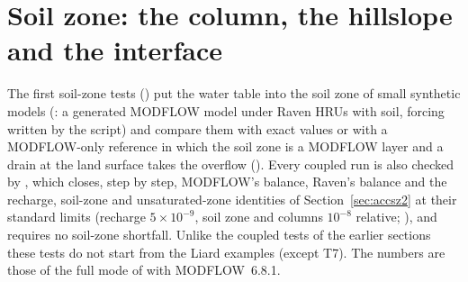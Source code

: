 \section{Soil zone: the column, the hillslope and the interface}\label{sec:vsoilzone1}
The first soil-zone tests () put the water table into the soil zone of small synthetic models
(: a generated MODFLOW model under Raven HRUs with soil, forcing written by the script) and compare
them with exact values or with a MODFLOW-only reference in which the soil zone is a MODFLOW layer and a drain at the land
surface takes the overflow (). Every coupled run is also checked by , which
closes, step by step, MODFLOW's balance, Raven's balance and the recharge, soil-zone and unsaturated-zone identities of
Section~\ref{sec:accsz2} at their standard limits (recharge $5\times10^{-9}$, soil zone and columns $10^{-8}$ relative;
), and requires no soil-zone shortfall. Unlike the coupled tests of the earlier sections these
tests do not start from the Liard examples (except T7). The numbers are those of the full mode of
 with MODFLOW~6.8.1.

